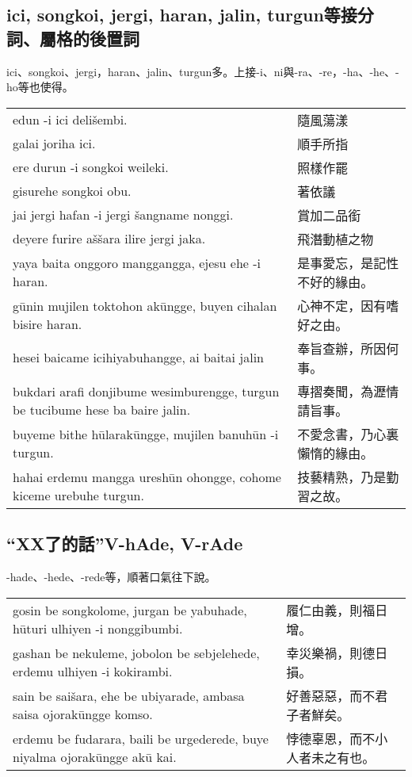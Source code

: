 \documentclass{article}
\begin{document}
\subsection{ici, songkoi, jergi, haran, jalin, turgun等接分詞、屬格的後置詞}
\noindent ici、songkoi、jergi，haran、jalin、turgun多。上接-i、ni與-ra、-re，-ha、-he、-ho等也使得。
\begin{center}
    \begin{tabularx}{\textwidth}{XX}
        edun -i ici deli\v{s}embi. & 隨風蕩漾\\
        galai joriha ici. & 順手所指\\
        ere durun -i songkoi weileki. & 照樣作罷\\
        gisurehe songkoi obu. & 著依議\\
        jai jergi hafan -i jergi \v{s}angname nonggi. & 賞加二品銜\\
        deyere furire a\v{s}\v{s}ara ilire jergi jaka. & 飛潛動植之物\\
        yaya baita onggoro manggangga, ejesu ehe -i haran. & 是事愛忘，是記性不好的緣由。\\
        g\={u}nin mujilen toktohon ak\={u}ngge, buyen cihalan bisire haran. & 心神不定，因有嗜好之由。\\
        hesei baicame icihiyabuhangge, ai baitai jalin& 奉旨查辦，所因何事。\\
        bukdari arafi donjibume wesimburengge, turgun be tucibume hese ba baire jalin. & 專摺奏聞，為瀝情請旨事。\\
        buyeme bithe h\={u}larak\={u}ngge, mujilen banuh\={u}n -i turgun. & 不愛念書，乃心裏懶惰的緣由。\\
        hahai erdemu mangga uresh\={u}n ohongge, cohome kiceme urebuhe turgun. & 技藝精熟，乃是勤習之故。
    \end{tabularx}
\end{center}

\subsection{“XX了的話”V-hAde, V-rAde}
\noindent -hade、-hede、-rede等，順著口氣往下說。
\begin{center}
    \begin{tabularx}{\textwidth}{XX}
        gosin be songkolome, jurgan be yabuhade, h\={u}turi ulhiyen -i nonggibumbi. & 履仁由義，則福日增。\\
        gashan be nekuleme, jobolon be sebjelehede, erdemu ulhiyen -i kokirambi. & 幸災樂禍，則德日損。\\
        sain be sai\v{s}ara, ehe be ubiyarade, ambasa saisa ojorak\={u}ngge komso. & 好善惡惡，而不君子者鮮矣。\\ 
        erdemu be fudarara, baili be urgederede, buye niyalma ojorak\={u}ngge ak\={u} kai. & 悖德辜恩，而不小人者未之有也。
    \end{tabularx}
\end{center}
\end{document}
